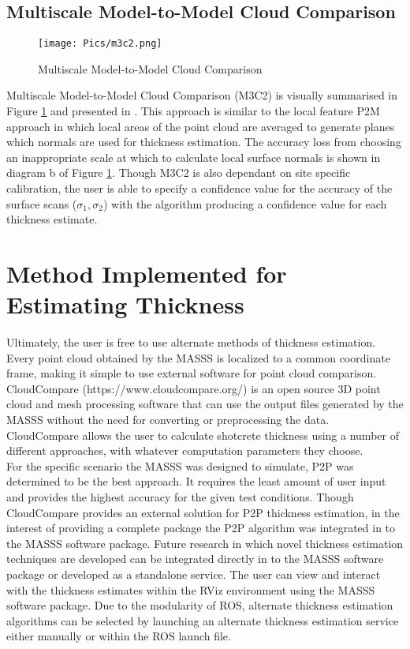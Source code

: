 \subsection{Multiscale Model-to-Model Cloud Comparison}
\begin{figure}[h!]
    \centering
    \texttt{[image: Pics/m3c2.png]}
    \caption{Multiscale Model-to-Model Cloud Comparison \cite{thick1}}
    \label{fig:m3c2}
\end{figure}

Multiscale Model-to-Model Cloud Comparison (M3C2) is visually summarised in Figure \ref{fig:m3c2} and presented in \cite{thick2}. This approach is similar to the local feature P2M approach in which local areas of the point cloud are averaged to generate planes which normals are used for thickness estimation. The accuracy loss from choosing an inappropriate scale at which to calculate local surface normals is shown in diagram b of Figure \ref{fig:m3c2}. Though M3C2 is also dependant on site specific calibration, the user is able to specify a confidence value for the accuracy of the surface scans ($\sigma_1,\sigma_2$) with the algorithm producing a confidence value for each thickness estimate.\\

\section{Method Implemented for Estimating Thickness}
Ultimately, the user is free to use alternate methods of thickness estimation. Every point cloud obtained by the MASSS is localized to a common coordinate frame, making it simple to use external software for point cloud comparison. CloudCompare (https://www.cloudcompare.org/) is an open source 3D point cloud and mesh processing software that can use the output files generated by the MASSS without the need for converting or preprocessing the data. CloudCompare allows the user to calculate shotcrete thickness using a number of different approaches, with whatever computation parameters they choose.\\

For the specific scenario the MASSS was designed to simulate, P2P was determined to be the best approach. It requires the least amount of user input and provides the highest accuracy for the given test conditions. Though CloudCompare provides an external solution for P2P thickness estimation, in the interest of providing a complete package the P2P algorithm was integrated in to the MASSS software package. Future research in which novel thickness estimation techniques are developed can be integrated directly in to the MASSS software package or developed as a standalone service. The user can view and interact with the thickness estimates within the RViz environment using the MASSS software package. Due to the modularity of ROS, alternate thickness estimation algorithms can be selected by launching an alternate thickness estimation service either manually or within the ROS launch file.\\